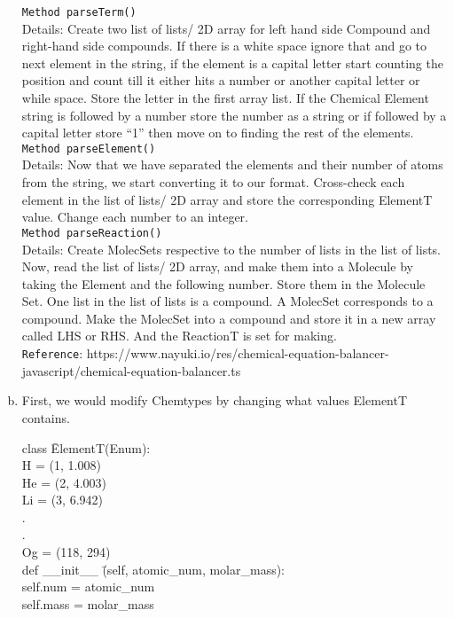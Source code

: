 \documentclass[12pt]{article}
\begin{document}
\begin{enumerate}[a)]
\texttt{Method parseTerm()}\\
Details: Create two list of lists/ 2D array for left hand side Compound and right-hand side compounds. If there is a white space ignore that and go to next element in the string, if the element is a capital letter start counting the position and count till it either hits a number or another capital letter or while space. Store the letter in the first array list. If the Chemical Element string is followed by a number store the number as a string or if followed by a capital letter store “1” then move on to finding the rest of the elements. \\

\texttt{Method parseElement()}\\
Details: Now that we have separated the elements and their number of atoms from the string, we start converting it to our format. Cross-check each element in the list of lists/ 2D array and store the corresponding ElementT value. Change each number to an integer.\\

\texttt{Method parseReaction()}\\
Details: Create MolecSets respective to the number of lists in the list of lists. Now, read the list of lists/ 2D array, and make them into a Molecule by taking the Element and the following number. Store them in the Molecule Set. One list in the list of lists is a compound. A MolecSet corresponds to a compound. Make the MolecSet into a compound and store it in a new array called LHS or RHS. And the ReactionT is set for making.\\

\texttt{Reference}: https://www.nayuki.io/res/chemical-equation-balancer-javascript/chemical-equation-balancer.ts

\item First, we would modify Chemtypes by changing what values ElementT contains.
\begin{tabbing}
class \= ElementT(Enum):\\
         \> H = (1, 1.008) \\
		  \> He = (2, 4.003)\\
		  \> Li = (3, 6.942)\\
		  \> . \\
		  \> . \\
		  \> Og = (118, 294) \\

	\> def \_\_init\_\_ \= (self, atomic\_num, molar\_mass): \+ \\
	\> self.num = atomic\_num\\
	\> self.mass = molar\_mass \- \\


\end{tabbing}
\end{enumerate}
\end{document}
